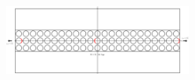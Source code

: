 \documentclass[first,firstsupp,lastsupp,last,hyperref,table]{ETHclass}
\begin{document}
\begin{frame}
\begin{columns}[c]
\begin{column}{0.5\textwidth}
\begin{figure}
\end{figure}
\end{column}
\end{columns}
\vspace{-.25cm}
\begin{figure}
\centering
\includegraphics[width=0.55\textwidth]{ninetyplythickness.pdf}
\end{figure}
\end{frame}

\addtocounter{framenumber}{-1}
\end{document}
